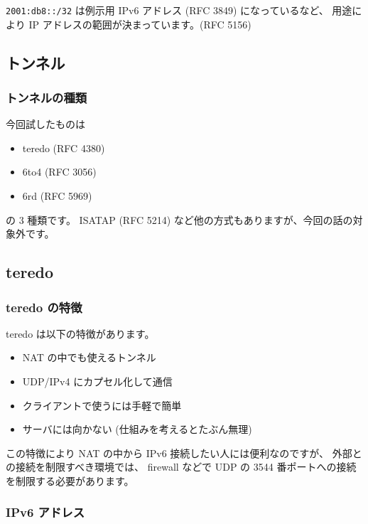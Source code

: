 \documentclass[mingoth,a4paper]{jsarticle}
\begin{document}
\texttt{2001:db8::/32} は例示用 IPv6 アドレス (RFC 3849) になっているなど、
用途により IP アドレスの範囲が決まっています。(RFC 5156)
\subsection{トンネル}
\subsubsection{トンネルの種類}

今回試したものは

\begin{itemize}
\item teredo (RFC 4380)
\item 6to4 (RFC 3056)
\item 6rd (RFC 5969)
\end{itemize}


の 3 種類です。
ISATAP (RFC 5214) など他の方式もありますが、今回の話の対象外です。
\subsection{teredo}

\subsubsection{teredo の特徴}


teredo は以下の特徴があります。

\begin{itemize}
\item NAT の中でも使えるトンネル
\item UDP/IPv4 にカプセル化して通信
\item クライアントで使うには手軽で簡単
\item サーバには向かない (仕組みを考えるとたぶん無理)
\end{itemize}


この特徴により NAT の中から IPv6 接続したい人には便利なのですが、
外部との接続を制限すべき環境では、 firewall などで UDP の
3544 番ポートへの接続を制限する必要があります。
\subsubsection{IPv6 アドレス}
\end{document}
